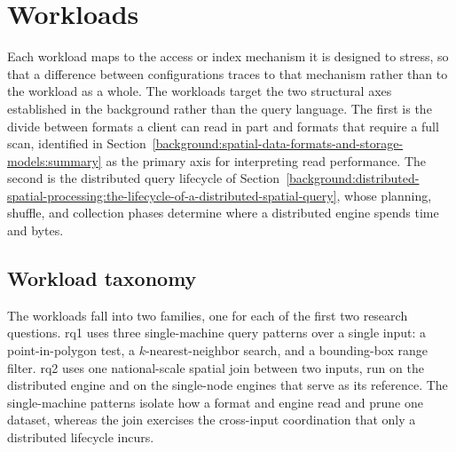 \section{Workloads}
\label{research-design-and-methodology:workloads}

Each workload maps to the access or index mechanism it is designed to stress, so that a difference between configurations traces to that mechanism rather than to the workload as a whole. The workloads target the two structural axes established in the background rather than the query language. The first is the divide between formats a client can read in part and formats that require a full scan, identified in Section~\ref{background:spatial-data-formats-and-storage-models:summary} as the primary axis for interpreting read performance. The second is the distributed query lifecycle of Section~\ref{background:distributed-spatial-processing:the-lifecycle-of-a-distributed-spatial-query}, whose planning, shuffle, and collection phases determine where a distributed engine spends time and bytes.

\subsection{Workload taxonomy}
\label{research-design-and-methodology:workloads:workload-taxonomy}

The workloads fall into two families, one for each of the first two research questions. \acrshort{rq}1 uses three single-machine query patterns over a single input: a point-in-polygon test, a $k$-nearest-neighbor search, and a bounding-box range filter. \acrshort{rq}2 uses one national-scale spatial join between two inputs, run on the distributed engine and on the single-node engines that serve as its reference. The single-machine patterns isolate how a format and engine read and prune one dataset, whereas the join exercises the cross-input coordination that only a distributed lifecycle incurs.

